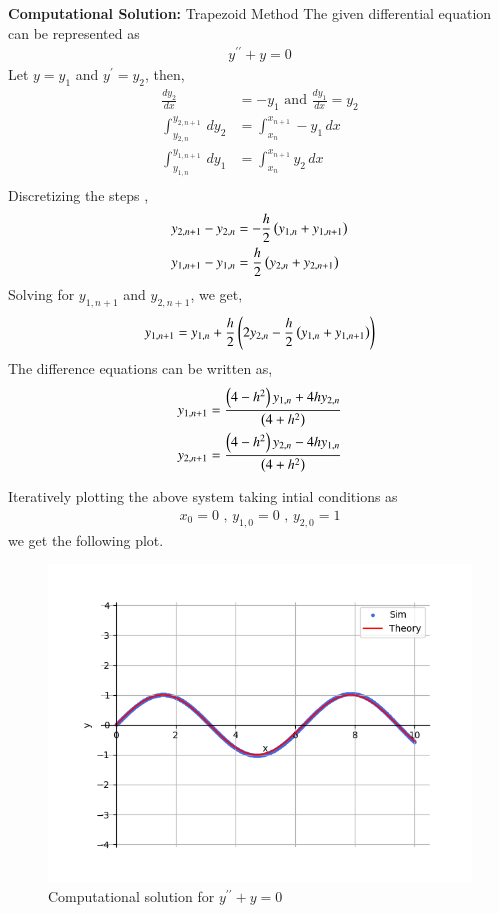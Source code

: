 \documentclass[journal]{IEEEtran}
\begin{document}
\textbf{Computational Solution:} Trapezoid Method
\newline
The given differential equation can be represented as 
\begin{align}
    y^{\prime\prime} + y = 0
\end{align}
Let $y = y_1$ and $y^{\prime} = y_2$, then, 
\begin{align}
    \frac{dy_2}{dx} &= -y_1 \text{ and } \frac{dy_1}{dx} = y_2\\
    \int_{y_{2, n}}^{y_{2, n + 1}} \, dy_2 &= \int_{x_n}^{x_{n + 1}} -y_1 \, dx\\
    \int_{y_{1, n}}^{y_{1, n + 1}} \, dy_1 &= \int_{x_n}^{x_{n + 1}} y_2 \, dx\\
\end{align}
Discretizing the steps ,
\begin{align}
    y_{2, n + 1} - y_{2, n} &= -\frac{h}{2}\left(y_{1, n} + y_{1, n + 1}\right)\\
    y_{1, n + 1} - y_{1, n} &= \frac{h}{2}\left(y_{2, n} + y_{2, n + 1}\right)
\end{align}
Solving for $y_{1, n + 1}$ and $y_{2, n + 1}$, we get,
\begin{align}
    y_{1, n + 1} = y_{1, n} + \frac{h}{2}\left(2y_{2, n} - \frac{h}{2}\left(y_{1, n} + y_{1, n + 1}\right)\right)\\
\end{align}
The difference equations can be written as,
\begin{align}
    y_{1, n + 1} = \frac{\left(4 - h^2\right)y_{1, n} + 4hy_{2, n}}{\left(4 + h^2\right)}\\
    y_{2, n + 1} = \frac{\left(4 - h^2\right)y_{2, n} - 4hy_{1, n}}{\left(4 + h^2\right)}\\
\end{align}

Iteratively plotting the above system taking intial conditions as 
\begin{align}
    x_0 = 0 \text{ , } y_{1, 0} = 0 \text{ , } y_{2, 0} = 1
\end{align}
we get the following plot.

\begin{figure}[h!]
    \centering
    \includegraphics[width=0.7\columnwidth]{figs/graph.png}
    \caption{Computational solution for $y^{\prime\prime} + y = 0$}
    \label{label}
\end{figure}
\end{document}
